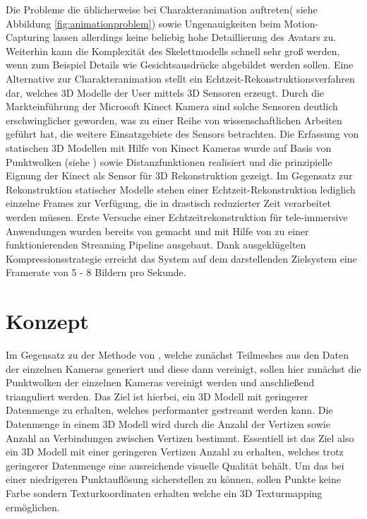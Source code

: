 Die Probleme die üblicherweise bei Charakteranimation auftreten( siehe Abbildung 
\ref{fig:animationproblem}) sowie Ungenauigkeiten beim Motion-Capturing lassen 
allerdings keine beliebig hohe Detaillierung des Avatars zu. Weiterhin kann die 
Komplexität des Skelettmodells schnell sehr groß werden, wenn zum Beispiel 
Details wie Gesichtsausdrücke abgebildet werden sollen. Eine Alternative zur 
Charakteranimation stellt ein Echtzeit-Rekonstruktionsverfahren dar, welches 
3D Modelle der User mittels 3D Sensoren erzeugt. Durch die Markteinführung der 
Microsoft Kinect Kamera sind solche Sensoren deutlich erschwinglicher geworden, 
was zu einer Reihe von wissenschaftlichen Arbeiten geführt hat, die weitere 
Einsatzgebiete des Sensors betrachten. Die Erfassung von statischen 3D Modellen 
mit Hilfe von Kinect Kameras wurde auf Basis von Punktwolken 
(siehe \cite{tong2012scanning}) sowie Distanzfunktionen 
\cite{Izadi:2011:KRR:2047196.2047270} realisiert und die prinzipielle Eignung 
der Kinect als Sensor für 3D Rekonstruktion gezeigt. Im Gegensatz zur 
Rekonstruktion statischer Modelle stehen einer Echtzeit-Rekonstruktion 
lediglich einzelne Frames zur Verfügung, die in drastisch reduzierter Zeit 
verarbeitet werden müssen. Erste Versuche einer Echtzeitrekonstruktion für 
tele-immersive Anwendungen wurden bereits von \cite{alexiadis2013real} gemacht 
und mit Hilfe von \cite{mekuria2013teleimmersion} zu einer funktionierenden 
Streaming Pipeline ausgebaut. Dank ausgeklügelten Kompressionsstrategie erreicht 
das System auf dem darstellenden Zielsystem eine Framerate von 5 - 8 Bildern 
pro Sekunde.

\section{Konzept}
Im Gegensatz zu der Methode von \cite{alexiadis2013real}, welche zunächst 
Teilmeshes aus den Daten der einzelnen Kameras generiert und diese dann 
vereinigt, sollen hier zunächst die Punktwolken der einzelnen Kameras vereinigt 
werden und anschließend trianguliert werden. Das Ziel ist hierbei, ein 3D Modell 
mit geringerer Datenmenge zu erhalten, welches performanter gestreamt werden 
kann. Die Datenmenge in einem 3D Modell wird durch die Anzahl der Vertizen sowie 
Anzahl an Verbindungen zwischen Vertizen bestimmt. Essentiell ist das Ziel also 
ein 3D Modell mit einer geringeren Vertizen Anzahl zu erhalten, welches trotz 
geringerer Datenmenge eine ausreichende visuelle Qualität behält. Um das bei 
einer niedrigeren Punktauflösung sicherstellen zu können, sollen Punkte keine 
Farbe sondern Texturkoordinaten erhalten welche ein 3D Texturmapping ermöglichen.



